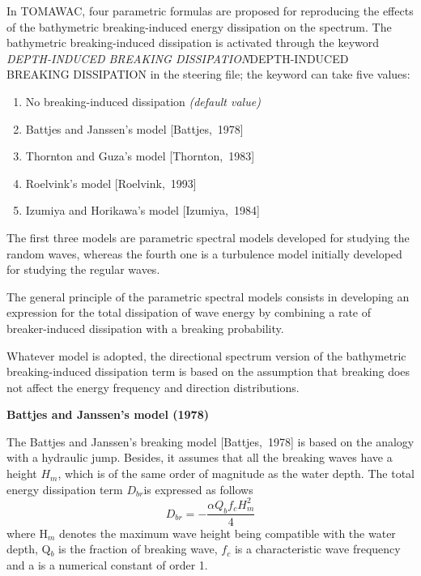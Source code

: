  In TOMAWAC, four parametric formulas are proposed for reproducing the effects of the bathymetric breaking-induced energy dissipation on the spectrum. The bathymetric breaking-induced dissipation is activated through the keyword \textit{DEPTH-INDUCED BREAKING DISSIPATION}DEPTH-INDUCED BREAKING DISSIPATION\textit{ }in the steering file; the keyword can take five values:

\begin{enumerate}
\item  No breaking-induced dissipation \textit{(default value)}

\item \textit{ }Battjes and Janssen's model [Battjes,~1978]

\item  Thornton and Guza's model [Thornton,~1983]

\item  Roelvink's model [Roelvink,~1993]

\item  Izumiya and Horikawa's model [Izumiya,~1984]
\end{enumerate}

The first three models are parametric spectral models developed for studying the random waves, whereas the fourth one is a turbulence model initially developed for studying the regular waves.

 The general principle of the parametric spectral models consists in developing an expression for the total dissipation of wave energy by combining a rate of breaker-induced dissipation with a breaking probability.

 Whatever model is adopted, the directional spectrum version of the bathymetric breaking-induced dissipation term is based on the assumption that breaking does not affect the energy frequency and direction distributions.


{\bf  Battjes and Janssen's model (1978)}

 The Battjes and Janssen's breaking model [Battjes,~1978] is based on the analogy with a hydraulic jump. Besides, it assumes that all the breaking waves have a height $H_{m} $, which is of the same order of magnitude as the water depth. The total energy dissipation term $D_{br} $is expressed as follows
\begin{equation} \label{GrindEQ__4_44_}
D_{br} =-\frac{\alpha Q_{b} f_{c} H_{m}^{2} }{4}
\end{equation}
where H${}_{m}$ denotes the maximum wave height being compatible with the water depth, Q${}_{b}$ is the fraction of breaking wave, $f_{c} $ is a characteristic wave frequency and a is a numerical constant of order 1.

